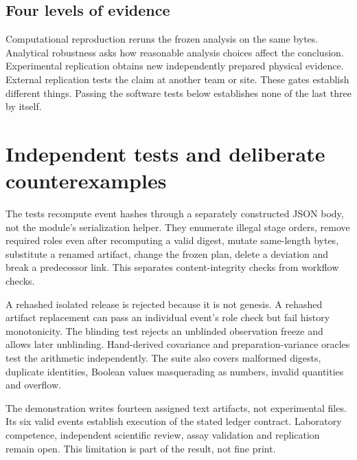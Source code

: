 \subsection{Four levels of evidence}
Computational reproduction reruns the frozen analysis on the same bytes.
Analytical robustness asks how reasonable analysis choices affect the conclusion.
Experimental replication obtains new independently prepared physical evidence.
External replication tests the claim at another team or site.
These gates establish different things. Passing the software tests below establishes
none of the last three by itself.

\section{Independent tests and deliberate counterexamples}
The tests recompute event hashes through a separately constructed JSON body, not the
module's serialization helper. They enumerate illegal stage orders, remove required
roles even after recomputing a valid digest, mutate same-length bytes, substitute a
renamed artifact, change the frozen plan, delete a deviation and break a predecessor
link. This separates content-integrity checks from workflow checks.

A rehashed isolated release is rejected because it is not genesis.
A rehashed artifact replacement can pass an individual event's role check but fail
history monotonicity. The blinding test rejects an unblinded observation freeze
and allows later unblinding. Hand-derived covariance and preparation-variance
oracles test the arithmetic independently.
The suite also covers malformed digests, duplicate identities,
Boolean values masquerading as numbers, invalid quantities and overflow.

The demonstration writes fourteen assigned text artifacts, not experimental files.
Its six valid events establish execution of the stated ledger contract.
Laboratory competence, independent scientific review, assay validation and replication
remain open. This limitation is part of the result, not fine print.

